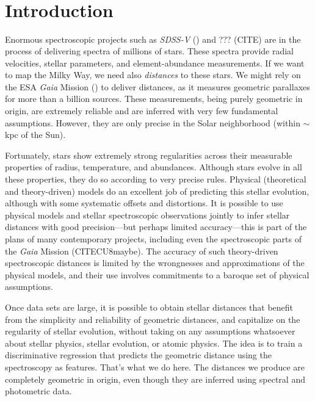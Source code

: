 \documentclass[modern]{aastex631}
\newcommand{\acronym}[1]{{\small{#1}}}
\newcommand{\project}[1]{\textsl{#1}}
\newcommand{\Gaia}{\project{Gaia}}
\newcommand{\SDSSV}{\project{\acronym{SDSS-V}}}
\begin{document}

\section*{~}
\clearpage
\section{Introduction}\label{sec:intro}

Enormous spectroscopic projects such as \SDSSV{} (\citealt{sdssv})
and ??? (CITE)
are in the process of delivering spectra of millions of stars.
These spectra provide radial velocities, stellar parameters, and element-abundance
measurements.
If we want to map the Milky Way, we need also \emph{distances} to these stars.
We might rely on the ESA \Gaia{} Mission (\citealt{gaia}) to deliver distances, as it measures
geometric parallaxes for more than a billion sources.
These measurements, being purely geometric in origin, are extremely reliable
and are inferred with very few fundamental assumptions.
However, they are only precise in the Solar neighborhood (within $\sim$kpc of the Sun).

Fortunately, stars show extremely strong regularities across their measurable
properties of radius, temperature, and abundances.
Although stars evolve in all these properties, they do so according to very
precise rules.
Physical (theoretical and theory-driven) models do an excellent job of predicting
this stellar evolution, although with some systematic offsets and distortions.
It is possible to use physical models and stellar spectroscopic observations
jointly to infer stellar distances with good precision---but perhaps limited
accuracy---this is part of the plans of many contemporary projects, including even
the spectroscopic parts of the \Gaia{} Mission (CITECU8maybe).
The accuracy of such theory-driven spectroscopic distances is limited by the
wrongnesses and approximations of the physical models, and their use involves
commitments to a baroque set of physical assumptions.

Once data sets are large, it is possible to obtain stellar distances
that benefit from the simplicity and reliability of geometric distances, and
capitalize on the regularity of stellar evolution, without taking on any assumptions
whatsoever about stellar physics, stellar evolution, or atomic physics.
The idea is to train a discriminative regression that predicts the geometric
distance using the spectroscopy as features.
That's what we do here.
The distances we produce are completely geometric in origin, even though they
are inferred using spectral and photometric data.
\end{document}
